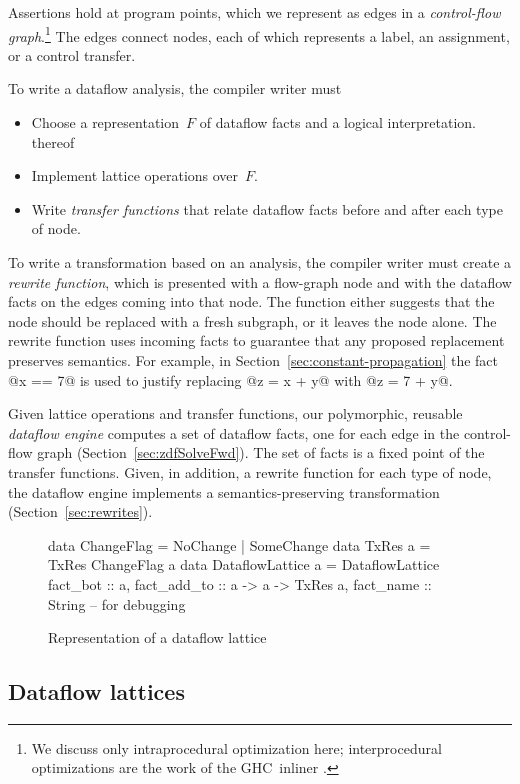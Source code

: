 \documentclass[blockstyle,preprint,nocopyrightspace]{sigplanconf}
\let\cite\citep
\newcommand\secref[1]{Section~\ref{sec:#1}}
\newcommand\figlabel[1]{\label{fig:#1}}
\begin{document}
Assertions hold at program points, which we represent as edges in
a \emph{control-flow graph}.\footnote
{We discuss only intraprocedural optimization here;
interprocedural optimizations are the work of the GHC~inliner
\cite{peyton-jones:secrets-inliner}.} 
The edges connect nodes, each of which represents a label, an assignment, or
a control transfer.

To write a dataflow analysis, the compiler
writer must 
\begin{itemize}
\item
Choose a representation~$F$ of dataflow facts and a logical interpretation.
thereof
\item
Implement lattice operations over~$F$.
\item
Write \emph{transfer functions} that relate dataflow facts before and
after each type of node.
\end{itemize}

To write a transformation based on an analysis, the compiler writer
must create a \emph{rewrite function}, which is presented with a
flow-graph node and with the dataflow facts on the edges coming
into that node.
The function either suggests that the node should be replaced with a
fresh subgraph, or it leaves the node alone.
The rewrite function uses incoming facts to guarantee that
any proposed replacement preserves semantics.
For example, in \secref{constant-propagation} the fact @x == 7@ is
used to justify replacing @z = x + y@ with @z = 7 + y@.

Given lattice operations and transfer functions, our
polymorphic, reusable \emph{dataflow engine} computes a
set of dataflow facts, one for each edge in the control-flow graph 
(\secref{zdfSolveFwd}).
The set of facts is a fixed point of the transfer functions.
Given, in addition, a rewrite function for each type of node,
the dataflow engine implements a semantics-preserving transformation
(\secref{rewrites}). 

\begin{figure}
\begin{code}
data ChangeFlag = NoChange | SomeChange
data TxRes a    = TxRes ChangeFlag a
data DataflowLattice a = DataflowLattice
 {fact_bot        :: a,
  fact_add_to     :: a -> a -> TxRes a,
  fact_name       :: String } -- for debugging
\end{code}
\caption{Representation of a dataflow lattice} \figlabel{lattice-type} \figlabel{lattice}
\end{figure}


\subsection{Dataflow lattices}
\end{document}

